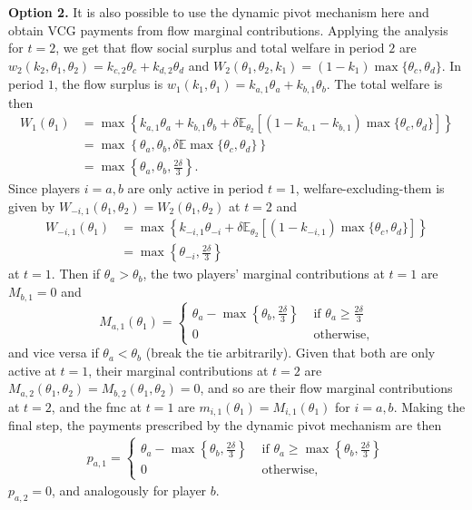 \documentclass[a4paper]{article}
\begin{document}
\begin{enumerate}
		\textbf{Option 2.} It is also possible to use the dynamic pivot mechanism here and obtain VCG payments from flow marginal contributions. Applying the analysis for $t=2$, we get that flow social surplus and total welfare in period $2$ are $w_2(k_2,\theta_1,\theta_2) = k_{c,2} \theta_c + k_{d,2} \theta_d$ and $W_2(\theta_1,\theta_2,k_1) = (1-k_1) \max \{\theta_c,\theta_d\}$. In period $1$, the flow surplus is $w_1(k_1,\theta_1) = k_{a,1} \theta_a + k_{b,1} \theta_b$. The total welfare is then 
		\begin{align*}
			W_1(\theta_1) &= \max \left\{ k_{a,1} \theta_a + k_{b,1} \theta_b + \delta \mathbb{E}_{\theta_2} \left[(1-k_{a,1}-k_{b,1}) \max \{\theta_c,\theta_d\} \right] \right\}
			\\
			&= \max \left\{ \theta_a, \theta_b, \delta \mathbb{E} \max \{\theta_c,\theta_d\} \right\}
			\\
			&= \max \left\{ \theta_a, \theta_b, \frac{2\delta}{3} \right\}.
		\end{align*}
		Since players $i=a,b$ are only active in period $t=1$, welfare-excluding-them is given by $W_{-i,1}(\theta_1,\theta_2) = W_2(\theta_1,\theta_2)$ at $t=2$ and
		\begin{align*}
			W_{-i,1}(\theta_1) &= \max \left\{ k_{-i,1} \theta_{-i} + \delta \mathbb{E}_{\theta_2} \left[(1-k_{-i,1}) \max \{\theta_c,\theta_d\} \right] \right\}
			\\
			&= \max \left\{ \theta_{-i}, \frac{2\delta}{3} \right\}
		\end{align*}
		at $t=1$. 
		Then if $\theta_a > \theta_b$, the two players' marginal contributions at $t=1$ are $M_{b,1} = 0$ and
		\begin{equation*}
			M_{a,1} (\theta_1) = \begin{cases}
				\theta_a - \max\left\{ \theta_b, \frac{2\delta}{3} \right\} & \text{ if } \theta_a \geq \frac{2\delta}{3}
				\\
				0 & \text{ otherwise},
			\end{cases}
		\end{equation*}
		and vice versa if $\theta_a < \theta_b$ (break the tie arbitrarily). Given that both are only active at $t=1$, their marginal contributions at $t=2$ are $M_{a,2}(\theta_1,\theta_2) = M_{b,2}(\theta_1,\theta_2) = 0$, and so are their flow marginal contributions at $t=2$, and the fmc at $t=1$ are $m_{i,1} (\theta_1) = M_{i,1} (\theta_1)$ for $i=a,b$. Making the final step, the payments prescribed by the dynamic pivot mechanism are then
		\begin{align*}
			p_{a,1} = \begin{cases}
				\theta_a - \max \left\{ \theta_b, \frac{2\delta}{3} \right\} & \text{ if } \theta_a \geq \max \left\{ \theta_b, \frac{2\delta}{3} \right\}
				\\
				0 & \text{ otherwise},
			\end{cases}
		\end{align*}
		$p_{a,2} = 0$, and analogously for player $b$.
		

\end{enumerate}
\end{document}
